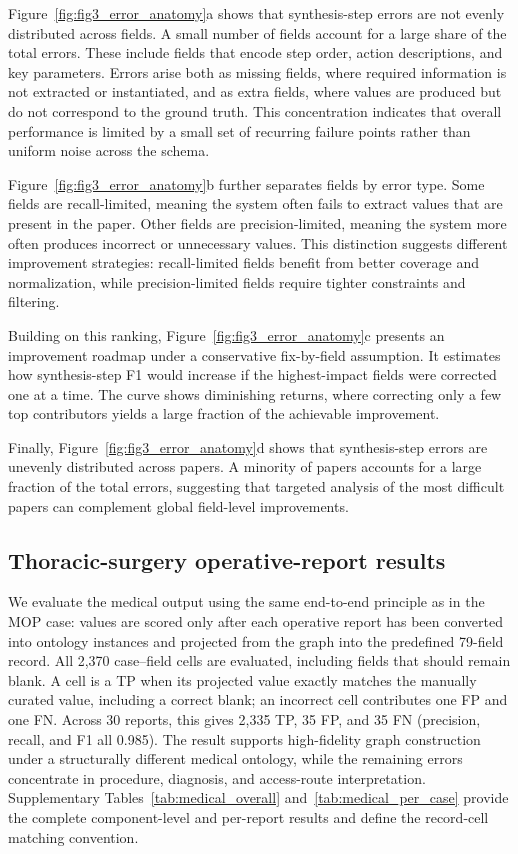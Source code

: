 Figure~\ref{fig:fig3_error_anatomy}a shows that synthesis-step errors are not evenly distributed across fields. A small number of fields account for a large share of the total errors. These include fields that encode step order, action descriptions, and key parameters. Errors arise both as missing fields, where required information is not extracted or instantiated, and as extra fields, where values are produced but do not correspond to the ground truth. This concentration indicates that overall performance is limited by a small set of recurring failure points rather than uniform noise across the schema.

Figure~\ref{fig:fig3_error_anatomy}b further separates fields by error type. Some fields are recall-limited, meaning the system often fails to extract values that are present in the paper. Other fields are precision-limited, meaning the system more often produces incorrect or unnecessary values. This distinction suggests different improvement strategies: recall-limited fields benefit from better coverage and normalization, while precision-limited fields require tighter constraints and filtering.

Building on this ranking, Figure~\ref{fig:fig3_error_anatomy}c presents an improvement roadmap under a conservative fix-by-field assumption. It estimates how synthesis-step F1 would increase if the highest-impact fields were corrected one at a time. The curve shows diminishing returns, where correcting only a few top contributors yields a large fraction of the achievable improvement.

Finally, Figure~\ref{fig:fig3_error_anatomy}d shows that synthesis-step errors are unevenly distributed across papers. A minority of papers accounts for a large fraction of the total errors, suggesting that targeted analysis of the most difficult papers can complement global field-level improvements.

\subsection{Thoracic-surgery operative-report results}\label{subsec:medical_results}

We evaluate the medical output using the same end-to-end principle as in the MOP case: values are scored only after each operative report has been converted into ontology instances and projected from the graph into the predefined 79-field record. All 2{,}370 case--field cells are evaluated, including fields that should remain blank. A cell is a TP when its projected value exactly matches the manually curated value, including a correct blank; an incorrect cell contributes one FP and one FN. Across 30 reports, this gives 2{,}335 TP, 35 FP, and 35 FN (precision, recall, and F1 all 0.985). The result supports high-fidelity graph construction under a structurally different medical ontology, while the remaining errors concentrate in procedure, diagnosis, and access-route interpretation. Supplementary Tables~\ref{tab:medical_overall} and~\ref{tab:medical_per_case} provide the complete component-level and per-report results and define the record-cell matching convention.


